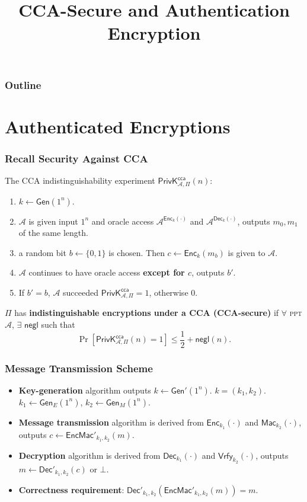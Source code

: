 
\title{CCA-Secure and Authentication Encryption}

\maketitle
\begin{frame}
\frametitle{Outline}
\tableofcontents
\end{frame}
\section{Authenticated Encryptions}
\begin{frame}\frametitle{Recall Security Against CCA}
The CCA indistinguishability experiment $\mathsf{PrivK}^{\mathsf{cca}}_{\mathcal{A},\Pi}(n)$:
\begin{enumerate}
	\item $k \gets \mathsf{Gen}(1^n)$.
	\item $\mathcal{A}$ is given input $1^n$ and oracle access $\mathcal{A}^{\mathsf{Enc}_k(\cdot)}$ and $\mathcal{A}^{\mathsf{Dec}_k(\cdot)}$, outputs $m_0, m_1$ of the same length.
	\item a random bit $b \gets \{0,1\}$ is chosen. Then $c \gets \mathsf{Enc}_k(m_b)$ is given to $\mathcal{A}$.
	\item $\mathcal{A}$ continues to have oracle access \textbf{except for $c$}, outputs $b'$.
	\item If $b' = b$, $\mathcal{A}$ succeeded $\mathsf{PrivK}^{\mathsf{cca}}_{\mathcal{A},\Pi}=1$, otherwise 0.
\end{enumerate}
\begin{definition}
$\Pi$ has \textbf{indistinguishable encryptions under a CCA (CCA-secure)} if $\forall$ \textsc{ppt} $\mathcal{A}$, $\exists$ $\mathsf{negl}$ such that
\[ \Pr\left[\mathsf{PrivK}^{\mathsf{cca}}_{\mathcal{A},\Pi}(n)=1\right] \le \frac{1}{2} + \mathsf{negl}(n).
\]
\end{definition}
\end{frame}
\begin{frame}\frametitle{Message Transmission Scheme}
\begin{figure}
\begin{center}

\end{center}
\end{figure}
\begin{itemize}
\item \textbf{Key-generation} algorithm outputs $k \gets \mathsf{Gen'}(1^n)$. $k = (k_1,k_2)$. $k_1 \gets \mathsf{Gen}_E(1^n)$, $k_2 \gets \mathsf{Gen}_M(1^n)$.
\item \textbf{Message transmission} algorithm is derived from $\mathsf{Enc}_{k_1}(\cdot)$ and $\mathsf{Mac}_{k_2}(\cdot)$, outputs $c \gets \mathsf{EncMac'}_{k_1,k_2}(m)$. 
\item \textbf{Decryption} algorithm is derived from $\mathsf{Dec}_{k_1}(\cdot)$ and $\mathsf{Vrfy}_{k_2}(\cdot)$, outputs $m \gets \mathsf{Dec}'_{k_1,k_2}(c)$ or $\bot$.
\item \textbf{Correctness requirement}: $\mathsf{Dec}'_{k_1,k_2}(\mathsf{EncMac}'_{k_1,k_2}(m)) = m$.
\end{itemize}
\end{frame}
